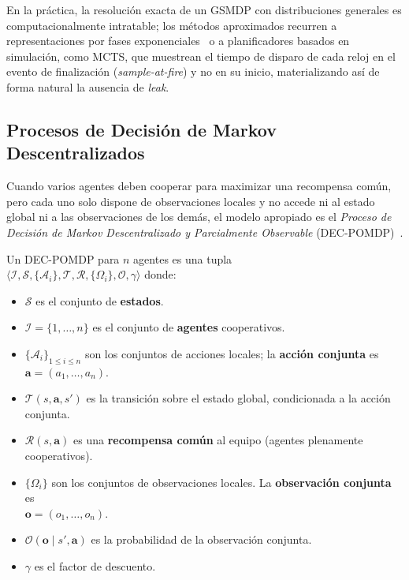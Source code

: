 En la práctica, la resolución exacta de un GSMDP con distribuciones generales es computacionalmente intratable; los métodos aproximados recurren a representaciones por fases exponenciales~\cite{younes2004gsmdp} o a planificadores basados en simulación, como MCTS, que muestrean el tiempo de disparo de cada reloj en el evento de finalización (\emph{sample-at-fire}) y no en su inicio, materializando así de forma natural la ausencia de \emph{leak}.

\subsection{Procesos de Decisión de Markov Descentralizados} \label{subsec:decposmdp} %

Cuando varios agentes deben cooperar para maximizar una recompensa común, pero cada uno solo dispone de observaciones locales y no accede ni al estado global ni a las observaciones de los demás, el modelo apropiado es el \emph{Proceso de Decisión de Markov Descentralizado y Parcialmente Observable} (DEC-POMDP)~\cite{bernstein2002complexity,oliehoek2016concise}.

\begin{definicion} \label{def:decpomdp} Un DEC-POMDP para $n$ agentes es una tupla \\ $\langle\mathcal{I}, \mathcal{S}, \{\mathcal{A}_i\}, \mathcal{T}, \mathcal{R}, \{\Omega_i\}, \mathcal{O}, \gamma\rangle$ donde: 
\begin{itemize}   
    \item $\mathcal{S}$ es el conjunto de \textbf{estados}.
    \item $\mathcal{I}=\{1,\dots,n\}$ es el conjunto de \textbf{agentes} cooperativos.   
    \item $\{\mathcal{A}_i\}_{1 \leq i \leq n}$ son los conjuntos de acciones locales; la \textbf{acción conjunta} es $\mathbf{a}=(a_1,\dots,a_n)$.   
    \item $\mathcal{T}(s,\mathbf{a},s')$ es la transición sobre el estado global, condicionada a la acción conjunta.   
    \item $\mathcal{R}(s,\mathbf{a})$ es una \textbf{recompensa común} al equipo (agentes plenamente cooperativos).   
    \item $\{\Omega_i\}$ son los conjuntos de observaciones locales. La \textbf{observación conjunta} es \\ $\mathbf{o}=(o_1,\dots,o_n)$.   
    \item $\mathcal{O}(\mathbf{o}\mid s',\mathbf{a})$ es la probabilidad de la observación conjunta. 
    \item $\gamma$ es el factor de descuento.
\end{itemize} 
\end{definicion}

